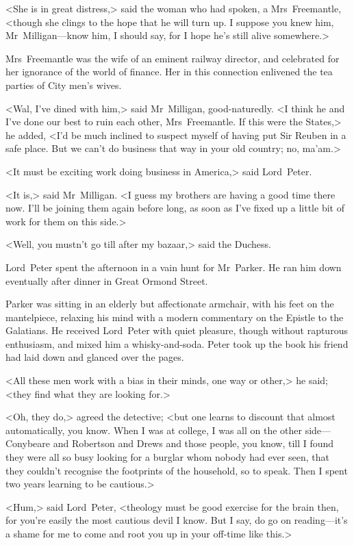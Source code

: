 <She is in great distress,> said the woman who had spoken, a Mrs~Freemantle, <though she clings to the hope that he will turn up. I suppose you knew him, Mr~Milligan—know him, I should say, for I hope he's still alive somewhere.>

Mrs~Freemantle was the wife of an eminent railway director, and celebrated for her ignorance of the world of finance. Her  in this connection enlivened the tea parties of City men's wives.

<Wal, I've dined with him,> said Mr~Milligan, good-naturedly. <I think he and I've done our best to ruin each other, Mrs~Freemantle. If this were the States,> he added, <I'd be much inclined to suspect myself of having put Sir Reuben in a safe place. But we can't do business that way in your old country; no, ma'am.>

<It must be exciting work doing business in America,> said Lord~Peter.

<It is,> said Mr~Milligan. <I guess my brothers are having a good time there now. I'll be joining them again before long, as soon as I've fixed up a little bit of work for them on this side.>

<Well, you mustn't go till after my bazaar,> said the Duchess.

Lord~Peter spent the afternoon in a vain hunt for Mr~Parker. He ran him down eventually after dinner in Great Ormond Street.

Parker was sitting in an elderly but affectionate armchair, with his feet on the mantelpiece, relaxing his mind with a modern commentary on the Epistle to the Galatians. He received Lord~Peter with quiet pleasure, though without rapturous enthusiasm, and mixed him a whisky-and-soda. Peter took up the book his friend had laid down and glanced over the pages.

<All these men work with a bias in their minds, one way or other,> he said; <they find what they are looking for.>

<Oh, they do,> agreed the detective; <but one learns to discount that almost automatically, you know. When I was at college, I was all on the other side—Conybeare and Robertson and Drews and those people, you know, till I found they were all so busy looking for a burglar whom nobody had ever seen, that they couldn't recognise the footprints of the household, so to speak. Then I spent two years learning to be cautious.>

<Hum,> said Lord~Peter, <theology must be good exercise for the brain then, for you're easily the most cautious devil I know. But I say, do go on reading—it's a shame for me to come and root you up in your off-time like this.>

